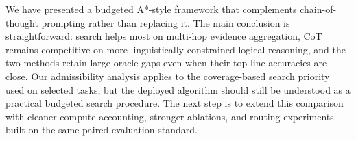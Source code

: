 \documentclass[11pt]{article}
\begin{document}
We have presented a budgeted A*-style framework that complements chain-of-thought prompting rather than replacing it. The main conclusion is straightforward: search helps most on multi-hop evidence aggregation, CoT remains competitive on more linguistically constrained logical reasoning, and the two methods retain large oracle gaps even when their top-line accuracies are close. Our admissibility analysis applies to the coverage-based search priority used on selected tasks, but the deployed algorithm should still be understood as a practical budgeted search procedure. The next step is to extend this comparison with cleaner compute accounting, stronger ablations, and routing experiments built on the same paired-evaluation standard.











\end{document}
